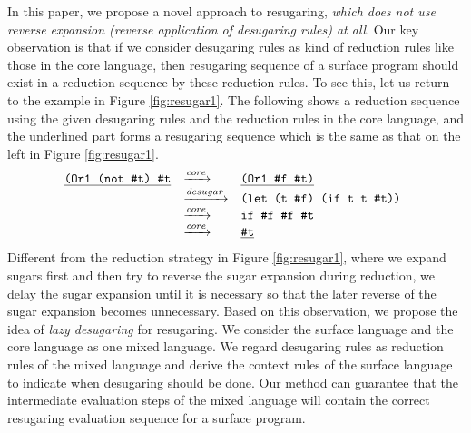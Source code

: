 \label{mark:mention}
In this paper, we propose a novel approach to resugaring, \emph{which does not use reverse expansion (reverse application of desugaring rules) at all}. Our key observation is that
if we consider desugaring rules as kind of reduction rules like those in the core language,  then resugaring sequence of a surface program should exist in a reduction sequence by these reduction rules. To see this, let us return to the example in Figure \ref{fig:resugar1}. The following shows a reduction sequence using the given desugaring rules and the reduction rules in the core language, and the underlined part forms a  resugaring sequence which is the same as that on the left in Figure \ref{fig:resugar1}.
\[
\begin{array}{llll}
\underline{\texttt{(Or1 (not \#t) \#t}}
  & \xrightarrow{core} & \underline{\texttt{(Or1 \#f \#t)}}\\
  & \xrightarrow{desugar} & \texttt{(let (t \#f) (if t t \#t)) }\\
	& \xrightarrow{core} & \texttt{if \#f \#f \#t}\\
	& \xrightarrow{core} & \underline{\texttt{\#t}}
\end{array}
\]
Different from the reduction strategy in Figure \ref{fig:resugar1}, where we expand sugars first and then try to reverse the sugar expansion during reduction, we delay the sugar expansion until it is necessary so that the later reverse of the sugar expansion becomes unnecessary.
Based on this observation, we propose the idea of {\em lazy desugaring} for resugaring.
We consider the surface language and the core language as one mixed language. We regard desugaring rules as reduction rules of the mixed language and derive the context rules of the surface language to indicate when desugaring should be done. Our method can guarantee that the intermediate evaluation steps of the mixed language will contain the correct resugaring evaluation sequence for a surface program.

